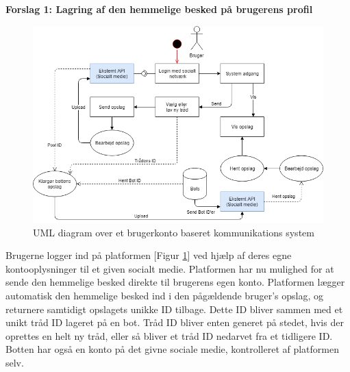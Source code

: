 \textbf{Forslag 1: Lagring af den hemmelige besked på brugerens profil}
\begin{figure}[H]
    \centering
    \includegraphics[width=0.8\linewidth]{Projectdoc/Assets/Illustrationer/userbased-system.png}
    \caption{UML diagram over et brugerkonto baseret kommunikations system}
    \label{fig:userbased}
\end{figure}

Brugerne logger ind på platformen [Figur \ref{fig:userbased}] ved hjælp af deres egne kontooplysninger til et given socialt medie. Platformen har nu mulighed for at sende den hemmelige besked direkte til brugerens egen konto. Platformen lægger automatisk den hemmelige besked ind i den pågældende bruger's opslag, og returnere samtidigt opslagets unikke ID tilbage. Dette ID bliver sammen med et unikt tråd ID lageret på en bot. Tråd ID bliver enten generet på stedet, hvis der oprettes en helt ny tråd, eller så bliver et tråd ID nedarvet fra et tidligere ID. Botten har også en konto på det givne sociale medie, kontrolleret af platformen selv. 

